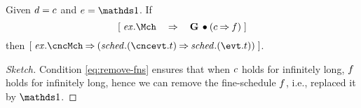\begin{Theorem}
\label{thm:remove-fns}
  Given $d = c$ and $\cncfsched = \one$. If
  \begin{equation}
    \label{eq:remove-fns}
    \ew{\execution.\Mch \WIDE\limp \G \initially (\csched \limp \fsched)}
  \end{equation}
  then $\ew{\execution.\cncMch \limp (\schedule.(\cncevt.t) \limp \schedule.(\evt.t))}$.
\end{Theorem}
\begin{proof}[Sketch]
  Condition \eqref{eq:remove-fns} ensures that when $c$ holds
  for infinitely long, $f$ holds for infinitely long, hence we can remove the
  fine-schedule $f$, i.e., replaced it by $\one$.
\end{proof}
%

%

%

%

